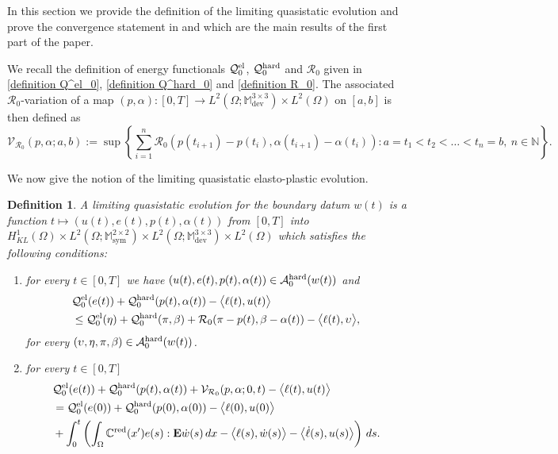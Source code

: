 \documentclass[reqno,10pt]{amsart}
\numberwithin{equation}{section}
\newtheorem{definition}[theorem]{Definition}
\theoremstyle{remark}
\newcommand{\calA}{\mathcal{A}}
\newcommand{\C}{\mathbb{C}}
\newcommand{\M}{\mathbb{M}}
\newcommand{\N}{\mathbb{N}}
\newcommand{\calQ}{\mathcal{Q}}
\newcommand{\calR}{\mathcal{R}}
\newcommand{\calV}{\mathcal{V}}
\DeclareMathOperator{\dev}{dev}
\DeclareMathOperator{\sym}{sym}
\newcommand{\E}{{\bf E}}
\newcommand{\red}[1]{#1^{\rm red}}
\begin{document}
In this section we provide the definition of the limiting quasistatic evolution and prove the convergence statement in  and  which are the main results of the first part of the paper. 

We recall the definition of energy functionals $\calQ^{\rm el}_{0}$, $\calQ^{\rm hard}_{0}$ and $\calR_{0}$ given in \eqref{definition Q^el_0}, \eqref{definition Q^hard_0} and \eqref{definition R_0}. 
The associated $\calR_{0}$-variation of a map $(p, \alpha) : [0, T] \to L^2(\Omega;\M^{3 \times 3}_{\dev}) \times L^2(\Omega)$ on $[a,b]$ is then defined as
\begin{equation*}
	\calV_{\calR_{0}}(p, \alpha; a, b) := \sup\left\{ \sum_{i = 1}^{n} \calR_{0}\!\left(p(t_{i+1}) - p(t_i), \alpha(t_{i+1}) - \alpha(t_i)\right) : a = t_1 < t_2 < \ldots < t_n = b,\ n \in \N \right\}.
\end{equation*}

We now give the notion of the limiting quasistatic elasto-plastic evolution.

\begin{definition} \label{limiting quasistatic evolution}
A \emph{limiting quasistatic evolution} for the boundary datum $w(t)$ is a function $t \mapsto (u(t), e(t), p(t), \alpha(t))$ from $[0, T]$ into $H^1_{KL}(\Omega) \times L^2(\Omega;\M^{2 \times 2}_{\sym}) \times L^2(\Omega;\M^{3 \times 3}_{\dev}) \times L^2(\Omega)$ which satisfies the following conditions:
\begin{enumerate}[label=(qs\arabic*)$_{0}$]
	\item \label{0-qs S} for every $t \in [0, T]$ we have $(u(t), e(t), p(t), \alpha(t)) \in \calA_{0}^{\rm hard}(w(t))$ and
	\begin{align*}
		& \calQ^{\rm el}_{0}(e(t)) + \calQ^{\rm hard}_{0}(p(t), \alpha(t)) 
		- \big\langle \ell(t), u(t) \big\rangle
		\\& \leq \calQ^{\rm el}_{0}(\eta) + \calQ^{\rm hard}_{0}(\pi, \beta) + \calR_{0}(\pi - p(t), \beta - \alpha(t)) 
		- \big\langle \ell(t), \upsilon \big\rangle,
	\end{align*}
	for every $(\upsilon, \eta, \pi, \beta) \in \calA_{0}^{\rm hard}(w(t))$.
	\item \label{0-qs E} %
	for every $t \in [0, T]$
	\begin{align*}
		& \calQ^{\rm el}_{0}(e(t)) + \calQ^{\rm hard}_{0}(p(t), \alpha(t)) 
		+ \calV_{\calR_{0}}(p, \alpha; 0, t) 
		- \big\langle \ell(t), u(t) \big\rangle
		\\& = \calQ^{\rm el}_{0}(e(0)) + \calQ^{\rm hard}_{0}(p(0), \alpha(0)) 
		- \big\langle \ell(0), u(0) \big\rangle 
		\\& + \int_0^t \left( \int_{\Omega} \red{\C}(x') e(s) : {\E}\dot{w}(s) \,dx - \big\langle \ell(s), \dot{w}(s) \big\rangle - \big\langle \dot{\ell}(s), u(s) \big\rangle \right) \,ds.
	\end{align*}
\end{enumerate}
\end{definition}
\end{document}
